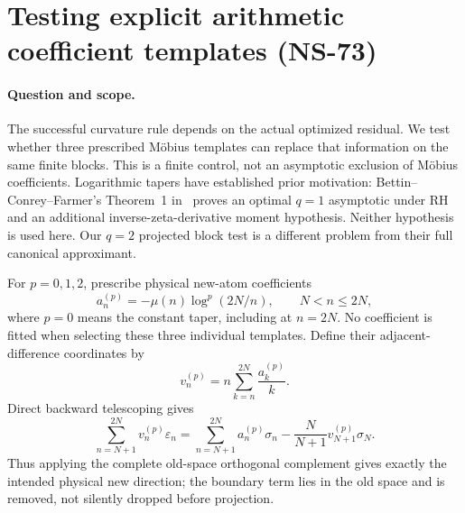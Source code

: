\section{Testing explicit arithmetic coefficient templates (NS-73)}
\label{sec:ns73-mobius-templates}

\paragraph{Question and scope.}
The successful curvature rule depends on the actual optimized residual.
We test whether three prescribed M\"obius templates can replace that
information on the same finite blocks. This is a finite control, not an
asymptotic exclusion of M\"obius coefficients. Logarithmic tapers have
established prior motivation: Bettin--Conrey--Farmer's Theorem~1
in~\cite{BettinConreyFarmer2013} proves an optimal $q=1$ asymptotic under
RH and an additional inverse-zeta-derivative moment hypothesis. Neither
hypothesis is used here. Our $q=2$ projected block test is a different
problem from their full canonical approximant.

For $p=0,1,2$, prescribe physical new-atom coefficients
\[
 a^{(p)}_n=-\mu(n)\log^p(2N/n),\qquad N<n\leq2N,
\]
where $p=0$ means the constant taper, including at $n=2N$.
No coefficient is fitted when selecting these three individual templates.
Define their adjacent-difference coordinates by
\begin{equation}
 v^{(p)}_n=n\sum_{k=n}^{2N}\frac{a^{(p)}_k}{k}.
 \label{eq:ns73-coordinate-change}
\end{equation}
Direct backward telescoping gives
\[
 \sum_{n=N+1}^{2N}v^{(p)}_n\varepsilon_n
 =\sum_{n=N+1}^{2N}a^{(p)}_n\sigma_n
                  -\frac{N}{N+1}v^{(p)}_{N+1}\sigma_N.
\]
Thus applying the complete old-space orthogonal complement gives exactly
the intended physical new direction; the boundary term lies in the old
space and is removed, not silently dropped before projection.

